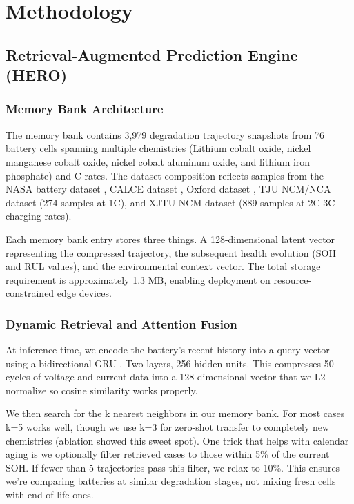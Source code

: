 \documentclass[5p,times,authoryear]{elsarticle}
\begin{document}
\section{Methodology}

\subsection{Retrieval-Augmented Prediction Engine (HERO)}


\subsubsection{Memory Bank Architecture}

The memory bank contains 3,979 degradation trajectory snapshots from 76 battery cells spanning multiple chemistries (Lithium cobalt oxide, nickel manganese cobalt oxide, nickel cobalt aluminum oxide, and lithium iron phosphate) and C-rates. The dataset composition reflects samples from the NASA battery dataset \citep{saha2007battery}, CALCE dataset \citep{he2011prognostics}, Oxford dataset \citep{birkl2017oxford}, TJU NCM/NCA dataset (274 samples at 1C), and XJTU NCM dataset (889 samples at 2C-3C charging rates).

Each memory bank entry stores three things. A 128-dimensional latent vector representing the compressed trajectory, the subsequent health evolution (SOH and RUL values), and the environmental context vector. The total storage requirement is approximately 1.3 MB, enabling deployment on resource-constrained edge devices.

\subsubsection{Dynamic Retrieval and Attention Fusion}

At inference time, we encode the battery's recent history into a query vector using a bidirectional GRU \citep{cho2014learning}. Two layers, 256 hidden units. This compresses 50 cycles of voltage and current data into a 128-dimensional vector that we L2-normalize so cosine similarity works properly.

We then search for the k nearest neighbors in our memory bank. For most cases k=5 works well, though we use k=3 for zero-shot transfer to completely new chemistries (ablation showed this sweet spot). One trick that helps with calendar aging is we optionally filter retrieved cases to those within 5\% of the current SOH. If fewer than 5 trajectories pass this filter, we relax to 10\%. This ensures we're comparing batteries at similar degradation stages, not mixing fresh cells with end-of-life ones.
\end{document}
